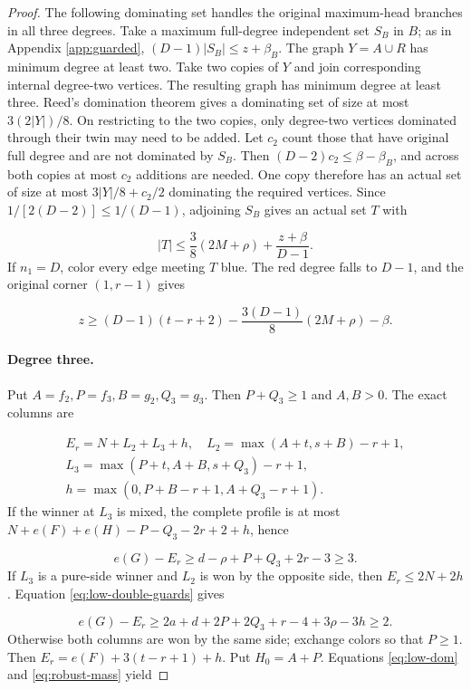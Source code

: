 \documentclass[11pt,a4paper]{article}
\theoremstyle{definition}
\begin{document}
\begin{proof}
The following dominating set handles the original maximum-head branches in all three degrees.
Take a maximum full-degree independent set $S_B$ in $B$; as in Appendix \ref{app:guarded},
$(D-1)|S_B|\le z+\beta_B$.
The graph $Y=A\cup R$ has minimum degree at least two.
Take two copies of $Y$ and join corresponding internal degree-two vertices.
The resulting graph has minimum degree at least three.
Reed's domination theorem \cite{reed} gives a dominating set of size at most $3(2|Y|)/8$.
On restricting to the two copies, only degree-two vertices dominated through their twin may need to be added.
Let $c_2$ count those that have original full degree and are not dominated by $S_B$.
Then $(D-2)c_2\le\beta-\beta_B$, and across both copies at most $c_2$ additions are needed.
One copy therefore has an actual set of size at most $3|Y|/8+c_2/2$ dominating the required vertices.
Since $1/[2(D-2)]\le1/(D-1)$, adjoining $S_B$ gives an actual set $T$ with

\[
 |T|\le\frac38(2M+\rho)+\frac{z+\beta}{D-1}.
\]
If $n_1=D$, color every edge meeting $T$ blue.
The red degree falls to $D-1$, and the original corner $(1,r-1)$ gives

\begin{equation}\label{eq:low-dom}
 z\ge(D-1)(t-r+2)-\frac{3(D-1)}8(2M+\rho)-\beta.
\end{equation}
\paragraph{Degree three.}
Put $A=f_2,P=f_3,B=g_2,Q_3=g_3$.
Then $P+Q_3\ge1$ and $A,B>0$.
The exact columns are

\[
\begin{gathered}
E_r=N+L_2+L_3+h,\quad
L_2=\max(A+t,s+B)-r+1,\\
L_3=\max(P+t,A+B,s+Q_3)-r+1,\\
h=\max(0,P+B-r+1,A+Q_3-r+1).
\end{gathered}
\]
If the winner at $L_3$ is mixed, the complete profile is at most
$N+e(F)+e(H)-P-Q_3-2r+2+h$, hence

\[
 e(G)-E_r\ge d-\rho+P+Q_3+2r-3\ge3.
\]
If $L_3$ is a pure-side winner and $L_2$ is won by the opposite side, then $E_r\le2N+2h$.
Equation \eqref{eq:low-double-guards} gives

\[
e(G)-E_r\ge2a+d+2P+2Q_3+r-4+3\rho-3h\ge2.
\]
Otherwise both columns are won by the same side; exchange colors so that $P\ge1$.
Then $E_r=e(F)+3(t-r+1)+h$.
Put $H_0=A+P$.
Equations \eqref{eq:low-dom} and \eqref{eq:robust-mass} yield


\end{proof}
\end{document}
